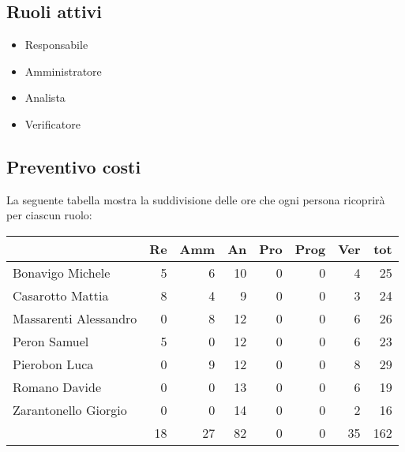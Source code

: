 \subsection{Ruoli attivi}
\begin{itemize}
    \item Responsabile 
    \item Amministratore 
    \item Analista 
    \item Verificatore
\end{itemize}

\subsection{Preventivo costi}

La seguente tabella mostra la suddivisione delle ore che ogni persona ricoprirà per ciascun ruolo:

\begin{table}[ht]
    \begin{tabularx}{\linewidth}{X|rrrrrrr}
    \rowcolor{gray!30}& Re & Amm & An & Pro & Prog & Ver & tot \\
    \hline
    Bonavigo Michele                        & 5 & 6 & 10 & 0 & 0 & 4 & 25 \\
    \rowcolor{gray!10}Casarotto Mattia      & 8 & 4 & 9 & 0 & 0 & 3 & 24 \\
    Massarenti Alessandro                   & 0 & 8 & 12 & 0 & 0 & 6 & 26 \\
    \rowcolor{gray!10}Peron Samuel          & 5 & 0 & 12 & 0 & 0 & 6 & 23 \\
    Pierobon Luca                           & 0 & 9 & 12 & 0 & 0 & 8 & 29 \\
    \rowcolor{gray!10}Romano Davide         & 0 & 0 & 13 & 0 & 0 & 6 & 19 \\
    Zarantonello Giorgio                    & 0 & 0 & 14 & 0 & 0 & 2 & 16 \\
    \hline                                  & 18 & 27 & 82 & 0 & 0 & 35 & 162 \\ 
    \end{tabularx}
\end{table}

